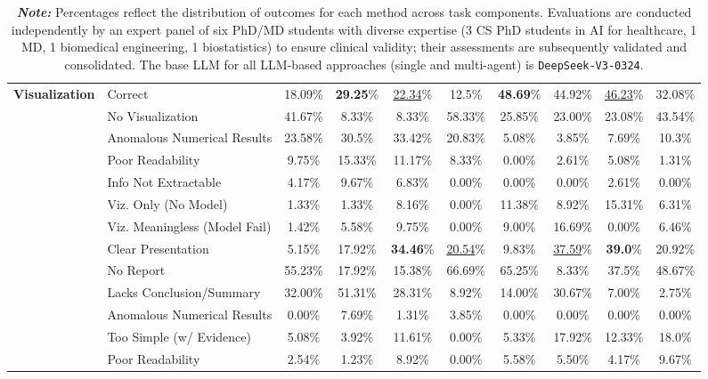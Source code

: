 \documentclass{article}
\begin{document}
\begin{table}[!ht]
{\begin{tabular}{@{}llcccccccc@{}}
\multirow{7}{*}{\textbf{Visualization}}
& Correct & 18.09\% & \textbf{29.25}\% & \underline{22.34}\% & 12.5\% & \textbf{48.69}\% & 44.92\% & \underline{46.23}\% & 32.08\% \\
& No Visualization & 41.67\% & 8.33\% & 8.33\% & 58.33\% & 25.85\% & 23.00\% & 23.08\% & 43.54\% \\
& Anomalous Numerical Results & 23.58\% & 30.5\% & 33.42\% & 20.83\% & 5.08\% & 3.85\% & 7.69\% & 10.3\% \\
& Poor Readability & 9.75\% & 15.33\% & 11.17\% & 8.33\% & 0.00\% & 2.61\% & 5.08\% & 1.31\% \\
& Info Not Extractable & 4.17\% & 9.67\% & 6.83\% & 0.00\% & 0.00\% & 0.00\% & 2.61\% & 0.00\% \\
& Viz. Only (No Model) & 1.33\% & 1.33\% & 8.16\% & 0.00\% & 11.38\% & 8.92\% & 15.31\% & 6.31\% \\
& Viz. Meaningless (Model Fail) & 1.42\% & 5.58\% & 9.75\% & 0.00\% & 9.00\% & 16.69\% & 0.00\% & 6.46\% \\
\hdashline

\multirow{6}{*}{\textbf{Reporting}}
& Clear Presentation & 5.15\% & 17.92\% & \textbf{34.46}\% & \underline{20.54}\% & 9.83\% & \underline{37.59}\% & \textbf{39.0}\% & 20.92\% \\
& No Report & 55.23\% & 17.92\% & 15.38\% & 66.69\% & 65.25\% & 8.33\% & 37.5\% & 48.67\% \\
& Lacks Conclusion/Summary & 32.00\% & 51.31\% & 28.31\% & 8.92\% & 14.00\% & 30.67\% & 7.00\% & 2.75\% \\
& Anomalous Numerical Results & 0.00\% & 7.69\% & 1.31\% & 3.85\% & 0.00\% & 0.00\% & 0.00\% & 0.00\% \\
& Too Simple (w/ Evidence) & 5.08\% & 3.92\% & 11.61\% & 0.00\% & 5.33\% & 17.92\% & 12.33\% & 18.0\% \\
& Poor Readability & 2.54\% & 1.23\% & 8.92\% & 0.00\% & 5.58\% & 5.50\% & 4.17\% & 9.67\% \\
\bottomrule
\end{tabular}%
}
\captionsetup{justification=raggedright,singlelinecheck=false,font=tiny}
\vspace{-2mm}
\caption*{
\textit{\textbf{Note:}} Percentages reflect the distribution of outcomes for each method across task components. Evaluations are conducted independently by an expert panel of six PhD/MD students with diverse expertise (3 CS PhD students in AI for healthcare, 1 MD, 1 biomedical engineering, 1 biostatistics) to ensure clinical validity; their assessments are subsequently validated and consolidated. The base LLM for all LLM-based approaches (single and multi-agent) is \texttt{DeepSeek-V3-0324}.
}
\end{table}
\end{document}
